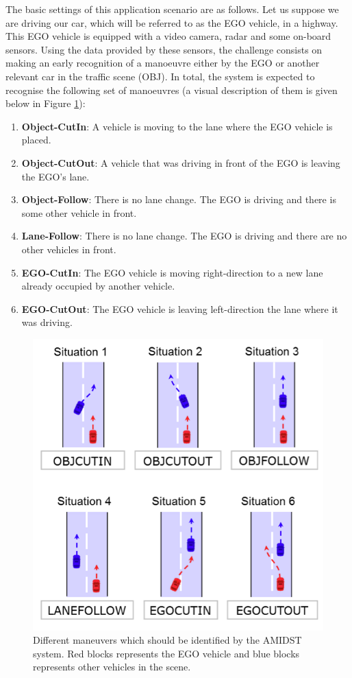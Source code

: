 The basic settings of this application scenario are as follows. Let us suppose we are driving our car, which will be referred to as the EGO vehicle, in a highway. This EGO vehicle is equipped with a video camera, radar and some on-board sensors.  Using the data provided by these sensors, the challenge consists on making an early recognition of a manoeuvre either by the EGO or another relevant car in the traffic scene (OBJ). In total, the system is expected to recognise the following set of manoeuvres (a visual description of them is given below in Figure \ref{Figure:DaimlerManeuvers}):
\begin{enumerate}
\item \textbf{Object-CutIn}: A vehicle is moving to the lane where the EGO vehicle is placed.
\item \textbf{Object-CutOut}:  A vehicle that was driving in front of the EGO is leaving the EGO's lane.
\item \textbf{Object-Follow}: There is no lane change. The EGO is driving and there is some other vehicle in front.
\item \textbf{Lane-Follow}: There is no lane change. The EGO is driving and there are no other vehicles in front.
\item \textbf{EGO-CutIn}: The EGO vehicle is moving right-direction to a new lane already occupied by another vehicle. 
\item \textbf{EGO-CutOut}: The EGO vehicle is leaving left-direction the lane where it was driving.
\end{enumerate}

\begin{figure}
\begin{center}
\includegraphics[scale=0.4]{./figures/DaimlerManeuvers}
\caption{\label{Figure:DaimlerManeuvers}Different maneuvers which should be identified by the AMIDST system.  Red blocks represents the EGO vehicle and blue blocks represents other vehicles in the scene.
}
\end{center}
\end{figure}

